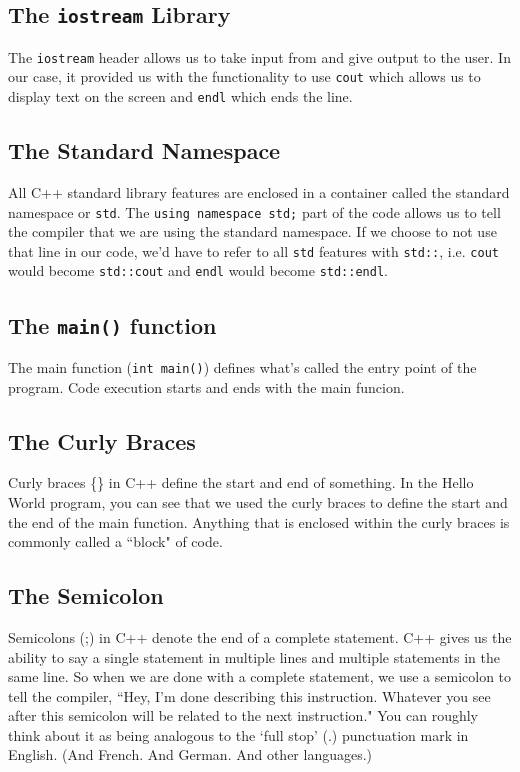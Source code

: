 \documentclass[letterpaper, 12pt]{book}
\begin{document}
\subsection*{The \lstinline{iostream} Library}
The \lstinline{iostream} header allows us to take input from and give output to the user. In our case, it provided us with the functionality to use \lstinline{cout} which allows us to display text on the screen and \lstinline{endl} which ends the line.
\subsection*{The Standard Namespace}
All C++ standard library features are enclosed in a container called the standard namespace or \lstinline{std}. The \lstinline{using namespace std;} part of the code allows us to tell the compiler that we are using the standard namespace. If we choose to not use that line in our code, we'd have to refer to all \lstinline{std} features with \lstinline{std::}, i.e. \lstinline{cout} would become \lstinline{std::cout} and \lstinline{endl} would become \lstinline{std::endl}.
\subsection*{The \lstinline{main()} function}
The main function (\lstinline{int main()}) defines what's called the entry point of the program. Code execution starts and ends with the main funcion.
\subsection*{The Curly Braces}
Curly braces \{\} in C++ define the start and end of something. In the Hello World program, you can see that we used the curly braces to define the start and the end of the main function. Anything that is enclosed within the curly braces is commonly called a ``block" of code.
\subsection*{The Semicolon}
Semicolons (;) in C++ denote the end of a complete statement. C++ gives us the ability to say a single statement in multiple lines and multiple statements in the same line. So when we are done with a complete statement, we use a semicolon to tell the compiler, ``Hey, I'm done describing this instruction. Whatever you see after this semicolon will be related to the next instruction."
You can roughly think about it as being analogous to the `full stop' (.) punctuation mark in English. (And French. And German. And other languages.)
\end{document}
